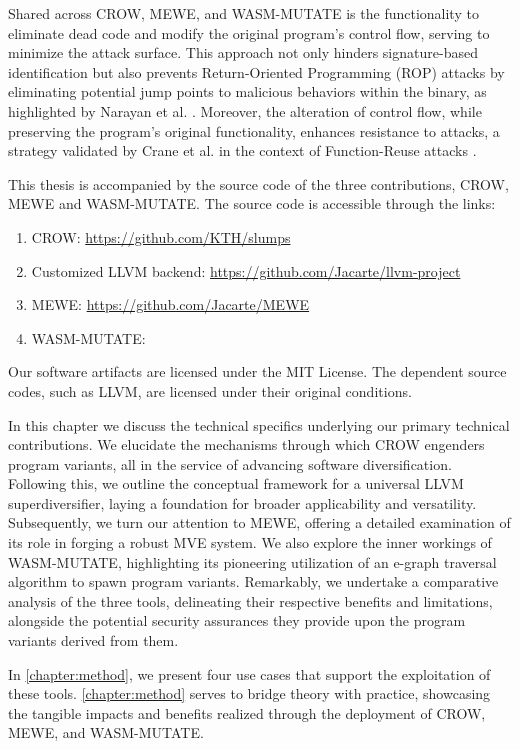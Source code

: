 Shared across CROW, MEWE, and WASM-MUTATE is the functionality to eliminate dead code and modify the original program's control flow, serving to minimize the attack surface.
This approach not only hinders signature-based identification \cite{CABRERAARTEAGA2023103296} but also prevents Return-Oriented Programming (ROP) attacks by eliminating potential jump points to malicious behaviors within the binary, as highlighted by Narayan et al. \cite{Swivel}. 
Moreover, the alteration of control flow, while preserving the program's original functionality, enhances resistance to attacks, a strategy validated by Crane et al. in the context of Function-Reuse attacks \cite{10.1145/2810103.2813682, 10.1145/3453483.3454035}. 



This thesis is accompanied by the source code of the three contributions, CROW, MEWE and WASM-MUTATE. 
The source code is accessible through the links:
\begin{enumerate}
    \item CROW: \url{https://github.com/KTH/slumps}
    \item Customized LLVM backend: \url{https://github.com/Jacarte/llvm-project}
    \item MEWE: \url{https://github.com/Jacarte/MEWE}
    \item WASM-MUTATE: 
\end{enumerate}

Our software artifacts are licensed under the MIT License. The dependent source codes, such as LLVM, are licensed under their original conditions.


In this chapter we discuss the technical specifics underlying our primary technical contributions.
We elucidate the mechanisms through which CROW engenders program variants, all in the service of advancing software diversification. 
Following this, we outline the conceptual framework for a universal LLVM superdiversifier, laying a foundation for broader applicability and versatility.
Subsequently, we turn our attention to MEWE, offering a detailed examination of its role in forging a robust MVE system. 
We also explore the inner workings of WASM-MUTATE, highlighting its pioneering utilization of an e-graph traversal algorithm to spawn \wasm program variants. 
Remarkably, we undertake a comparative analysis of the three tools, delineating their respective benefits and limitations, alongside the potential security assurances they provide upon the program variants derived from them. 

In \autoref{chapter:method}, we present four use cases that support the exploitation of these tools.
\autoref{chapter:method} serves to bridge theory with practice, showcasing the tangible impacts and benefits realized through the deployment of CROW, MEWE, and WASM-MUTATE.
